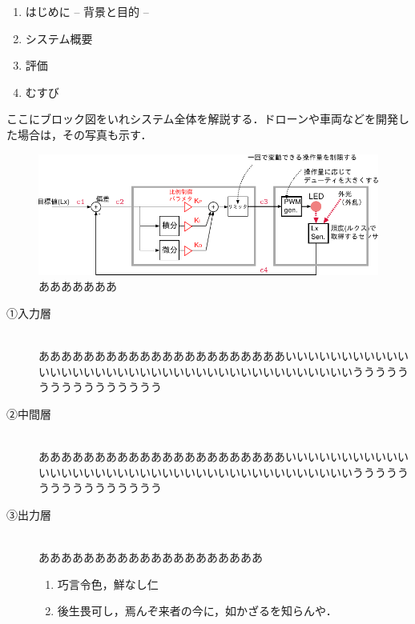 \begin{enumerate}
	\item {\color{gray}はじめに -- 背景と目的 --}
	\item システム概要
	\item 評価
	\item むすび
\end{enumerate}
\newpage


ここにブロック図をいれシステム全体を解説する．ドローンや車両などを開発した場合は，その写真も示す．
\begin{figure}[h]
\begin{center}
\includegraphics[width=\textwidth]{fig/system.pdf}
\caption{あああああああ}
\end{center}
\end{figure}
\newpage

\begin{description} 
	\item[①入力層]~\\
	ああああああああああああああああああああああいいいいいいいいいいいいいいいいいいいいいいいいいいいいいいいいいいいいいいいうううううううううううううううう
	\item[②中間層]~\\
	ああああああああああああああああああああああいいいいいいいいいいいいいいいいいいいいいいいいいいいいいいいいいいいいいいいうううううううううううううううう
	\item[③出力層]~\\
	あああああああ{\color{red}ああああああああ}あああああ
	\begin{enumerate}
		\item 巧言令色，鮮なし仁
		\item 後生畏可し，焉んぞ来者の今に，如かざるを知らんや．
	\end{enumerate}
\end{description}
\newpage

